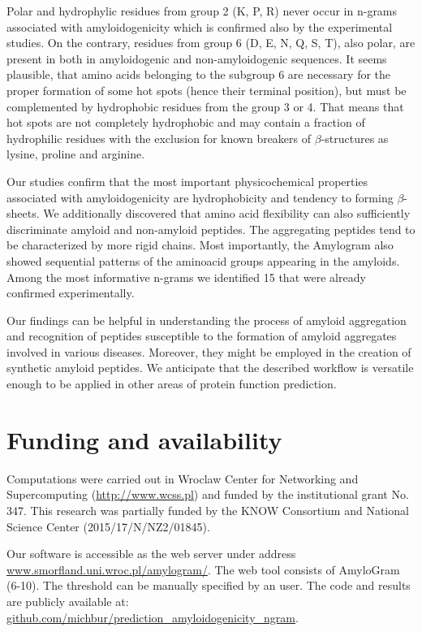 \documentclass[fleqn,10pt,twoside]{gcb15submission}
\begin{document}
  Polar and hydrophylic residues from group 2 (K, P, R) never occur in n-grams 
associated with amyloidogenicity which is confirmed also by the experimental 
studies. On the contrary, residues from group 6 (D, E, N, Q, S, T), also polar, 
are present in both in amyloidogenic and non-amyloidogenic sequences. It seems 
plausible, that amino acids belonging to the subgroup 6 are necessary for the 
proper formation of some hot spots (hence their terminal position), but must be 
complemented by hydrophobic residues from the group 3 or 4. That means that hot 
spots are not completely hydrophobic and may contain a fraction of hydrophilic 
residues with the exclusion for known breakers of $\beta$-structures as lysine, 
proline and arginine.

  Our studies confirm that the most important physicochemical properties 
associated with amyloidogenicity are hydrophobicity and tendency to forming 
$\beta$-sheets.  We additionally discovered that amino acid flexibility can also 
sufficiently discriminate amyloid and non-amyloid peptides. The aggregating 
peptides tend to be characterized by more rigid chains. Most importantly, the 
Amylogram also showed sequential patterns of the aminoacid groups appearing in 
the amyloids. Among the most informative n-grams we identified 15 that were 
already confirmed experimentally. 

  Our findings can be helpful in understanding the process of amyloid 
aggregation and recognition of peptides susceptible to the formation of amyloid 
aggregates involved in various diseases. Moreover, they might be employed in the 
creation of synthetic amyloid peptides. We anticipate that the described 
workflow is versatile enough to be applied in other areas of protein function 
prediction.

\section*{Funding and availability}

Computations were carried out in Wroclaw Center for Networking and 
Supercomputing (\url{http://www.wcss.pl}) and funded by the institutional grant 
No. 347. This research was partially funded by the KNOW Consortium and National 
Science Center (2015/17/N/NZ2/01845).

  Our software is accessible as the web server under address 
\url{www.smorfland.uni.wroc.pl/amylogram/}. The web tool consists of AmyloGram 
(6-10). The threshold can be manually specified by an user. The code and 
results are publicly available at: 
\url{github.com/michbur/prediction_amyloidogenicity_ngram}.


\end{document}
